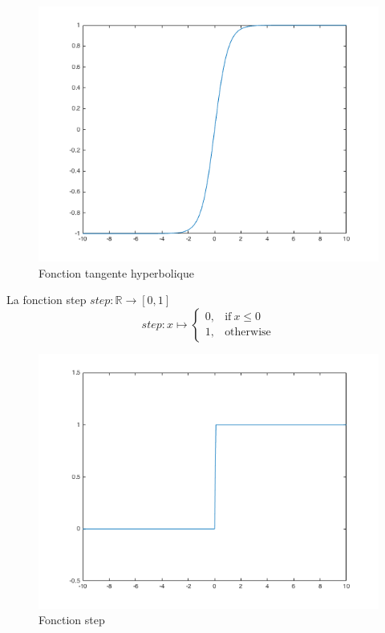 \documentclass{article}
\begin{document}
\begin{figure}[H]
\begin{center}
	\includegraphics[scale=0.4]{tanh.png} 
	\caption{Fonction tangente hyperbolique}
\end{center}
\end{figure}

La fonction step $step : \mathbb{R} \rightarrow [0, 1]$
\begin{equation}
	step : x \mapsto
		\begin{cases}
			0, & \text{if}\ x \leq 0\\
			1, & \text{otherwise}
		\end{cases}
\end{equation}

\begin{figure}[H]
\begin{center}
	\includegraphics[scale=0.4]{step.png} 
	\caption{Fonction step}
\end{center}
\end{figure}
\end{document}
